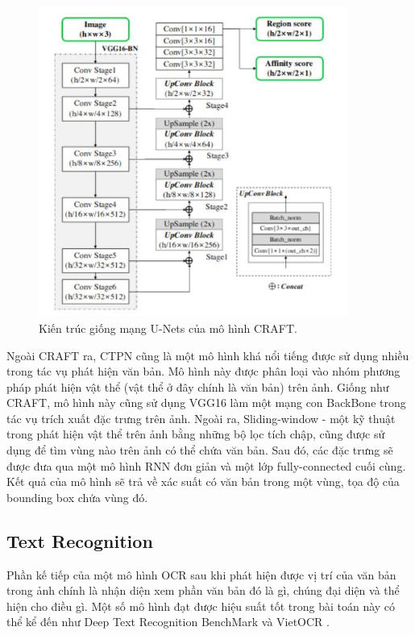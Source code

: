 \begin{itemize}
\begin{figure}
\centering
\includegraphics[width=0.9\textwidth]{mep_img/Capture4.JPG}
\caption{Kiến trúc giống mạng U-Nets của mô hình CRAFT. }\label{fig_2.7}
\end{figure}
\end{itemize}
Ngoài CRAFT ra, CTPN \cite{tian2016detecting} cũng là một mô hình khá nổi tiếng được sử dụng nhiều trong tác vụ phát hiện văn bản. Mô hình này được phân loại vào nhóm phương pháp phát hiện vật thể (vật thể ở đây chính là văn bản) trên ảnh. Giống như CRAFT, mô hình này cũng sử dụng VGG16 làm một mạng con BackBone trong tác vụ trích xuất đặc trưng trên ảnh. Ngoài ra, Sliding-window - một kỹ thuật trong phát hiện vật thể trên ảnh bằng những bộ lọc tích chập, cũng được sử dụng để tìm vùng nào trên ảnh có thể chứa văn bản. Sau đó, các đặc trưng sẽ được đưa qua một mô hình RNN đơn giản và một lớp fully-connected cuối cùng. Kết quả của mô hình sẽ trả về xác suất có văn bản trong một vùng, tọa độ của bounding box chứa vùng đó. 
\subsection{Text Recognition}
Phần kế tiếp của một mô hình OCR sau khi phát hiện được vị trí của văn bản trong ảnh
chính là nhận diện xem phần văn bản đó là gì, chúng đại diện và thể hiện cho điều gì. Một
số mô hình đạt được hiệu suất tốt trong bài toán này có thể kể đến như Deep Text
Recognition BenchMark \cite{baek2019wrong} và VietOCR \cite{VietOCR}.

